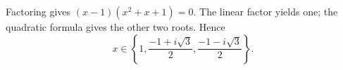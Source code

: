 Factoring gives $(x-1)(x^2+x+1)=0$. The linear factor yields one; the quadratic formula gives the other two roots. Hence
\[\boxed{x\in\left\{1,\dfrac{-1+i\sqrt3}{2},\dfrac{-1-i\sqrt3}{2}\right\}}.\]
